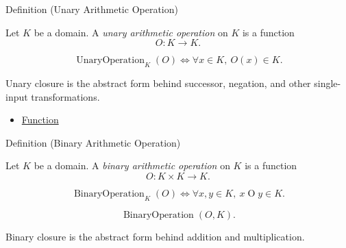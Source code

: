 \begin{definitionbox}{Definition (Unary Arithmetic Operation)}
\begin{definition}
\label{def:unary-arithmetic-operation}
Let $K$ be a domain. A \emph{unary arithmetic operation} on $K$ is a function
\[
O:K\to K.
\]
\end{definition}
\end{definitionbox}

\begin{remark*}
\[
\operatorname{UnaryOperation}_K(O)
\Longleftrightarrow
\forall x\in K,\ O(x)\in K.
\]
\end{remark*}

\begin{remark*}[Interpretation]
Unary closure is the abstract form behind successor, negation, and other
single-input transformations.
\end{remark*}

\begin{dependencies}
\begin{itemize}
  \item \hyperref[def:function]{Function}
\end{itemize}
\end{dependencies}

\begin{definitionbox}{Definition (Binary Arithmetic Operation)}
\begin{definition}
\label{def:binary-arithmetic-operation}
Let $K$ be a domain. A \emph{binary arithmetic operation} on $K$ is a function
\[
O:K\times K\to K.
\]
\end{definition}
\end{definitionbox}

\begin{remark*}
\[
\operatorname{BinaryOperation}_K(O)
\Longleftrightarrow
\forall x,y\in K,\ x\mathbin{O}y\in K.
\]
\end{remark*}

\begin{remark*}
\[
\operatorname{BinaryOperation}(O,K).
\]
\end{remark*}

\begin{remark*}[Interpretation]
Binary closure is the abstract form behind addition and multiplication.
\end{remark*}

